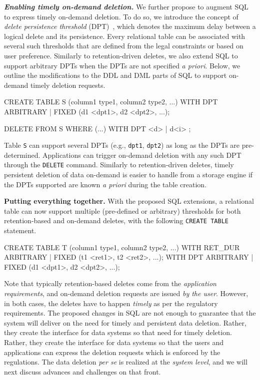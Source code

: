 \documentclass[11pt,dvipdfmx]{article}
\newcommand\Paragraph[1]{\vspace{0.02in}  \noindent \textbf{#1.}}
\newcommand\Paragraphbit[1]{\vspace{0.02in}  \noindent \textbf{\textit{#1.}}}
\begin{document}
\Paragraphbit{Enabling timely on-demand deletion}
We further propose to augment SQL to express timely on-demand deletion. To do so, 
we introduce the concept of \textit{delete persistence threshold} 
(DPT)~\cite{Sarkar2020}, which denotes the maximum delay between a logical delete and 
its persistence. Every relational table can be associated with several such thresholds
that are defined from the legal constraints or based on user preference.
Similarly to retention-driven deletes, we also extend SQL to support arbitrary DPTs 
when the DPTs are not specified \textit{a priori}. 
Below, we outline the modifications to the DDL and DML parts of SQL to support on-demand timely deletion requests.
\begin{verbnobox}[\fontsize{9pt}{10pt}\selectfont]
 CREATE TABLE S (column1 type1, column2 type2, ...) 
 WITH DPT {ARBITRARY | FIXED (d1 <dpt1>, d2 <dpt2>, ...)};
\end{verbnobox}
\begin{verbnobox}[\fontsize{9pt}{10pt}\selectfont]
 DELETE FROM S WHERE (...) WITH DPT { <d> | d<i> };
\end{verbnobox}
Table \texttt{S} can support several DPTs (e.g., \texttt{dpt1}, \texttt{dpt2}) as long 
as the DPTs are pre-determined. Applications can trigger on-demand deletion 
with any such DPT through the \texttt{DELETE} command. 
Similarly to retention-driven deletes, timely persistent deletion of data on-demand is easier to handle from a storage engine if the DPTs supported are known \textit{a priori} during the table creation.

\Paragraph{Putting everything together}
With the proposed SQL extensions, a relational table can now support multiple 
(pre-defined or arbitrary) thresholds for both retention-based and on-demand deletes, 
with the following \texttt{CREATE TABLE} statement. 
\begin{verbnobox}[\fontsize{9pt}{10pt}\selectfont]
 CREATE TABLE T (column1 type1, column2 type2, ...) 
 WITH RET_DUR {ARBITRARY | FIXED (t1 <ret1>, t2 <ret2>, ...)};
 WITH DPT {ARBITRARY | FIXED (d1 <dpt1>, d2 <dpt2>, ...)};
\end{verbnobox}
Note that typically retention-based deletes come from the \emph{application requirements},  and 
on-demand deletion requests are issued \emph{by the user}. However, in both cases,
the deletes have to happen \emph{timely} as per the regulatory requirements.
The proposed changes in SQL are not enough to guarantee that the system will deliver on the
need for timely and persistent data deletion. Rather, they create the interface for data systems so that
need for timely deletion. Rather, they create the interface for data systems so that
the users and applications can express the deletion requests which is enforced by the regulations. The data deletion \emph{per se} is realized at the \textit{system level}, and we will next discuss advances and challenges on that front.
\end{document}
